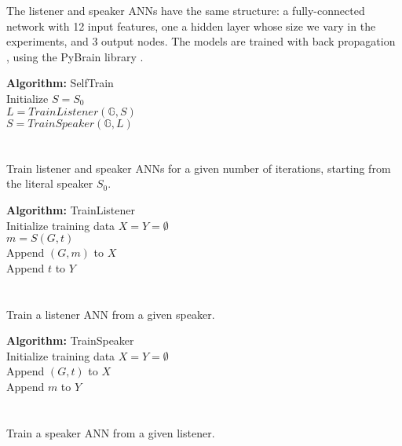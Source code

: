 The listener and speaker ANNs have the same structure: a
fully-connected network with 12 input features, one a hidden layer 
whose size we vary in the experiments, and 3 output nodes. The models 
are trained with back propagation \citep{Rumelhart-etal:1986}, using 
the PyBrain library \citep{Schaul:2010:PYB:1756006.1756030}.


\begin{algorithm}
{\bf Algorithm: }SelfTrain\\
Initialize $S = S_0$\\
 {
$L = TrainListener(\mathbb{G}, S)$\\
$S = TrainSpeaker(\mathbb{G}, L)$\\
}
\\
~\\
\caption{Train listener and speaker ANNs for a given number of iterations, starting from the literal speaker $S_0$.}
\label{alg:selftrain}
\end{algorithm}

\vspace{-12pt}

\begin{algorithm}
{\bf Algorithm: }TrainListener\\
Initialize training data $X = Y = \emptyset$\\
 {
   {
    $m = S(G,t)$\\
    Append $(G,m)$ to $X$\\
    Append $t$ to $Y$\\
  }
}
\\
~\\
\caption{Train a listener ANN from a given speaker.}
\label{alg:train-listener}
\end{algorithm}

\begin{algorithm}
{\bf Algorithm:} TrainSpeaker\\
Initialize training data $X = Y = \emptyset$\\
 {
   {
     {
      Append $(G,t)$ to $X$\\
      Append $m$ to $Y$\\
    }
  }
}
\\
~\\
\caption{Train a speaker ANN from a given listener.}
\label{alg:train-speaker}
\end{algorithm}


